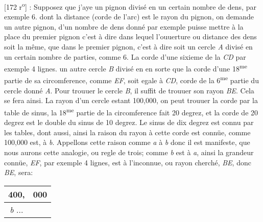                 \vspace*{8mm}
                \pstart 
                \normalsize
            [172 r\textsuperscript{o}] \protect{}: Supposez que j'aye un pignon\protect{} divis\'{e} en un  certain nombre de dens, par exemple 6. dont la distance (corde de l'arc)  est le rayon du pignon\protect{}, on demande un autre pignon\protect{}, d'un nombre  de dens donn\'{e} par exemple  puisse mettre  \`{a} la place du premier pignon\protect{} c'est \`{a} dire dans lequel l'ouuerture  ou distance des dens soit la même, que dans le premier pignon\protect{},  c'est \`{a} dire soit un cercle \textit{A} divis\'{e} en un certain nombre de parties,  comme 6. La corde d'une sixieme de la  \textit{CD} par exemple 4 lignes.  un autre cercle \textit{B} divis\'{e} en  en sorte que la corde d'une 18\textsuperscript{me} partie de sa circomference, comme \textit{EF}, soit egale \`{a} \textit{CD}, corde  de la 6\textsuperscript{me} partie du cercle donn\'{e} \textit{A}. Pour trouuer le cercle \textit{B}, il  suffit de trouuer son rayon \textit{BE}. Cela se fera ainsi. La rayon d'un cercle  estant  100,000, on peut trouuer la corde   par la table de sinus,  la 18\textsuperscript{me} partie de la circomference fait 20 degrez, et la corde de 20 degrez est le double du sinus de 10 degrez.  Le sinus de dix degrez est connu par les tables, dont  aussi, ainsi  la raison du rayon \`{a} cette corde est conn\"{u}e, comme 100,000 est, \`{a} \textit{b}.  Appellons cette raison comme \textit{a} \`{a} \textit{b} donc il est manifeste, que nous aurons cette analogie, ou regle de trois;  comme \textit{b} est \`{a} \textit{a}, ainsi la grandeur conn\"{u}e, \textit{EF}, par exemple 4 lignes,  est \`{a} l'inconnue, ou rayon cherch\'{e}, \textit{BE}, donc \textit{BE}, sera: \begin{tabular}{c|c} 400, & 000 \\ \hline \textit{b} ... & \\ \end{tabular}
